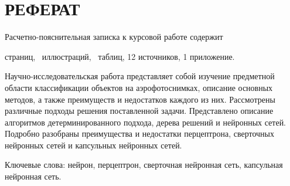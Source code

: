 

 

\setcounter{page}{3}

\chapter*{РЕФЕРАТ}
Расчетно-пояснительная записка к курсовой работе содержит  \begin{NoHyper}\pageref{LastPage}\end{NoHyper} страниц, \totfig~иллюстраций, \tottab~таблиц, 12 источников, 1 приложение.

Научно-исследовательская работа представляет собой изучение предметной области классификации объектов на аэрофотоснимках, описание основных методов, а также преимуществ и недостатков каждого из них. Рассмотрены различные подходы решения поставленной задачи. Представлено описание алгоритмов детерминированного подхода, дерева решений и нейронных сетей. Подробно разобраны преимущества и недостатки перцептрона, сверточных нейронных сетей и капсульных нейронных сетей.

Ключевые слова: нейрон, перцептрон, сверточная нейронная сеть, капсульная нейронная сеть.